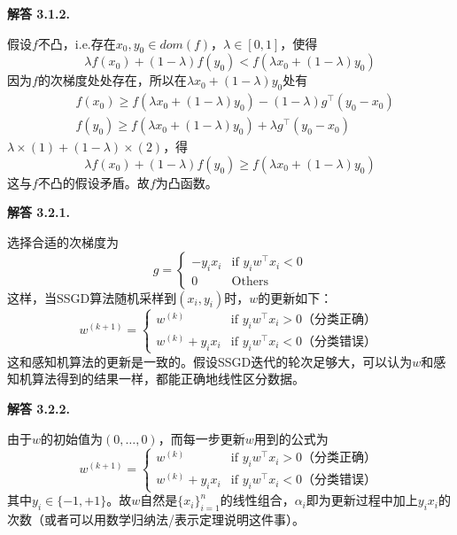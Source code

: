 \documentclass[12pt, a4paper, oneside]{ctexart}
\newenvironment{solution}[1]{\par\noindent\textbf{解答 #1. }\par}{\par}
\begin{document}
\begin{solution}{3.1.2}
    假设$f$不凸，i.e.存在$x_0, y_0 \in dom(f)$，$\lambda \in [0, 1]$，使得
    \begin{equation}
        \lambda f(x_0) + (1 - \lambda) f(y_0) < f(\lambda x_0 + (1 - \lambda) y_0) \nonumber
    \end{equation}
    因为$f$的次梯度处处存在，所以在$\lambda x_0 + (1 - \lambda) y_0$处有
    \begin{align}
        & f(x_0) \geq f(\lambda x_0 + (1 - \lambda) y_0) - (1 - \lambda) g^\top(y_0 - x_0) \\
        & f(y_0) \geq f(\lambda x_0 + (1 - \lambda) y_0) + \lambda g^\top(y_0 - x_0)
    \end{align}
    $\lambda \times (1) + (1 - \lambda) \times (2)$，得
    \begin{equation}
        \lambda f(x_0) + (1 - \lambda) f(y_0) \geq f(\lambda x_0 + (1 - \lambda) y_0) \nonumber
    \end{equation}
    这与$f$不凸的假设矛盾。故$f$为凸函数。
\end{solution}

\begin{solution}{3.2.1}
    选择合适的次梯度为
    \begin{equation}
        g = 
        \begin{cases}
            -y_ix_i & \text{if $y_iw^\top x_i < 0$} \\
            0 & \text{Others}
        \end{cases}
        \nonumber
    \end{equation}
    这样，当SSGD算法随机采样到$(x_i, y_i)$时，$w$的更新如下：
    \begin{equation}
        w^{(k+1)} =
        \begin{cases}
            w^{(k)} & \text{if $y_iw^\top x_i > 0$（分类正确）} \\
            w^{(k)} + y_ix_i & \text{if $y_iw^\top x_i < 0$（分类错误）}
        \end{cases}
        \nonumber
    \end{equation}
    这和感知机算法的更新是一致的。假设SSGD迭代的轮次足够大，可以认为$w$和感知机算法得到的结果一样，都能正确地线性区分数据。
\end{solution}

\begin{solution}{3.2.2}
    由于$w$的初始值为$(0, \dots, 0)$，而每一步更新$w$用到的公式为
    \begin{equation}
        w^{(k+1)} =
        \begin{cases}
            w^{(k)} & \text{if $y_iw^\top x_i > 0$（分类正确）} \\
            w^{(k)} + y_ix_i & \text{if $y_iw^\top x_i < 0$（分类错误）}
        \end{cases}
        \nonumber
    \end{equation}
    其中$y_i \in \{-1, +1\}$。故$w$自然是$\{x_i\}_{i=1}^n$的线性组合，$\alpha_i$即为更新过程中加上$y_ix_i$的次数（或者可以用数学归纳法/表示定理说明这件事）。
\end{solution}
\end{document}
